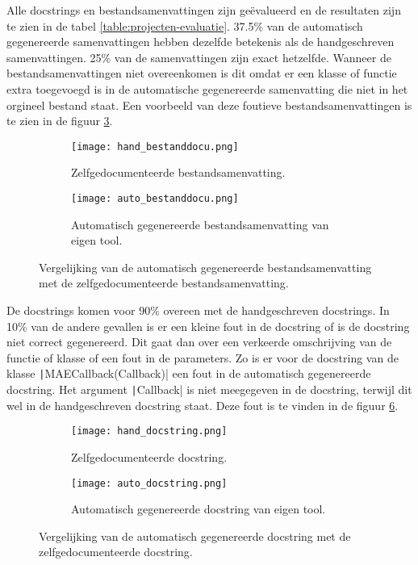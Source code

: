 Alle docstrings en bestandsamenvattingen zijn geëvalueerd en de resultaten zijn te zien in de tabel \ref{table:projecten-evaluatie}.
37.5\% van de automatisch gegenereerde samenvattingen hebben dezelfde betekenis als de handgeschreven samenvattingen. 25\% van de samenvattingen zijn exact hetzelfde.
Wanneer de bestandsamenvattingen niet overeenkomen is dit omdat er een klasse of functie extra toegevoegd is in de automatische gegenereerde samenvatting die niet in het orgineel bestand staat.
Een voorbeeld van deze foutieve bestandsamenvattingen is te zien in de figuur \ref{fig:evaluate-bestand-samenvatting}.

\begin{figure}
    \centering
    \begin{subfigure}[b]{0.5\textwidth}
        \centering
        \texttt{[image: hand\_bestanddocu.png]}
        \caption{Zelfgedocumenteerde bestandsamenvatting.}
        \label{fig:zelfgedocumenteerd-bestandsamenvatting}
    \end{subfigure}
    \hfill
    \begin{subfigure}[b]{0.5\textwidth}
        \centering
        \texttt{[image: auto\_bestanddocu.png]}
        \caption{Automatisch gegenereerde bestandsamenvatting van eigen tool.}
        \label{fig:automatisch-bestandsamenvatting}
    \end{subfigure}
    \caption{Vergelijking van de automatisch gegenereerde bestandsamenvatting met de zelfgedocumenteerde bestandsamenvatting.}
    \label{fig:evaluate-bestand-samenvatting}
\end{figure}

De docstrings komen voor 90\% overeen met de handgeschreven docstrings.
In 10\% van de andere gevallen is er een kleine fout in de docstring of is de docstring niet correct gegenereerd.
Dit gaat dan over een verkeerde omschrijving van de functie of klasse of een fout in de parameters.
Zo is er voor de docstring van de klasse \texttt|MAECallback(Callback)| een fout in de automatisch gegenereerde docstring.
Het argument \texttt|Callback| is niet meegegeven in de docstring, terwijl dit wel in de handgeschreven docstring staat.
Deze fout is te vinden in de figuur \ref{fig:evaluate-docstring}.

\begin{figure}
    \centering
    \begin{subfigure}[b]{0.5\textwidth}
        \centering
        \texttt{[image: hand\_docstring.png]}
        \caption{Zelfgedocumenteerde docstring.}
        \label{fig:zelfgedocumenteerd-docstring}
    \end{subfigure}
    \hfill
    \begin{subfigure}[b]{0.5\textwidth}
        \centering
        \texttt{[image: auto\_docstring.png]}
        \caption{Automatisch gegenereerde docstring van eigen tool.}
        \label{fig:automatisch-docstring}
    \end{subfigure}
    \caption{Vergelijking van de automatisch gegenereerde docstring met de zelfgedocumenteerde docstring.}
    \label{fig:evaluate-docstring}
\end{figure}

